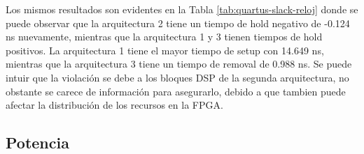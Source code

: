 \begin{table}[H]
  \centering
  \caption{Holgura de temporización por reloj y arquitectura. Todos los valores están en nanosegundos. }
  \label{tab:quartus-slack-reloj}
\end{table}

Los mismos resultados son evidentes en la Tabla \ref{tab:quartus-slack-reloj} donde se puede observar que la arquitectura 2 tiene un tiempo de hold negativo de -0.124 ns nuevamente, mientras que la arquitectura 1 y 3 tienen tiempos de hold positivos. La arquitectura 1 tiene el mayor tiempo de setup con 14.649 ns, mientras que la arquitectura 3 tiene un tiempo de removal de 0.988 ns. Se puede intuir que la violación se debe a los bloques DSP de la segunda arquitectura, no obstante se carece de información para asegurarlo, debido a que tambien puede afectar la distribución de los recursos en la FPGA.

\subsection{Potencia}

